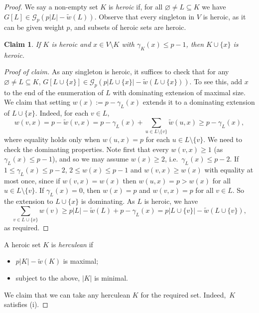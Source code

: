 \documentclass[11pt, a4paper]{article}
\newenvironment{poc}{\begin{proof}[Proof of claim]\renewcommand*{\qedsymbol}{$\blacksquare$}}{\end{proof}}
\newtheorem{claim}[theorem]{Claim}
\theoremstyle{definition}
\newcommand{\cG}{\mathcal{G}}
\begin{document}
\begin{proof}
We say a non-empty set $K$ is \emph{heroic} if, for all $\varnothing \neq L \subseteq K$ we have $G[L] \in \mathcal{G}_p(p|L|-\tilde{w}(L))$. Observe that every singleton in $V$ is heroic, as it can be given weight $p$, and subsets of heroic sets are heroic.

\begin{claim}\label{cl-hero}
If $K$ is heroic and $x \in V\setminus K$ with $\gamma_K(x) \leq p-1$, then $K \cup \{x\}$ is heroic.
\end{claim}
\begin{poc}
	As any singleton is heroic, it suffices to check that for any $\varnothing\neq L\subseteq K$, $G[L\cup \{x\}]\in\cG_p(p|L \cup \lbrace x\rbrace| - \tilde{w}(L \cup \lbrace x\rbrace))$. To see this, add $x$ to the end of the enumeration of $L$ with dominating extension of maximal size. We claim that setting $w(x):=p-\gamma_L(x)$ extends it to a dominating extension of $L\cup \{x\}$. Indeed, for each $v\in L$, \begin{equation*}%
		w(v,x)=p- \tilde{w}(v,x)= p-\gamma_L(x)+\sum_{u\in L\setminus \{v\}}\tilde{w}(u,x)\geq p-\gamma_L(x),
	\end{equation*}
	where equality holds only when $w(u,x)=p$ for each $u\in L\setminus \{v\}$.
	We need to check the dominating properties.
	Note first that every $w(v,x) \geq 1$ (as $\gamma_L(x) \leq p-1$), and so we may assume $w(x)\ge 2$, i.e.~$\gamma_L(x)\le p-2$. 
	If $1 \leq \gamma_L(x) \leq p-2$, $2 \leq w(x) \leq p-1$ and $w(v,x) \geq w(x)$ with equality at most once, since if $w(v,x)=w(x)$ then $w(u,x)=p>w(x)$ for all $u \in L\setminus\{v\}$.
	If $\gamma_L(x)=0$, then $w(x)=p$ and $w(v,x)=p$ for all $v \in L$.
	So the extension to $L \cup \{x\}$ is dominating.
	As $L$ is heroic, we have
	$$
	\sum_{v \in L\cup\lbrace x\rbrace}w(v) \geq p|L|-\tilde{w}(L)+p-\gamma_L(x) = p|L \cup \lbrace v\rbrace| - \tilde{w}(L \cup \lbrace v\rbrace),
	$$
	as required.
\end{poc}

A heroic set $K$ is \emph{herculean} if
\begin{itemize}
	\item $p|K|-\tilde{w}(K)$ is maximal; 
	\item subject to the above, $|K|$ is minimal.
\end{itemize}
We claim that we can take any herculean $K$ for the required set.
Indeed,~$K$ satisfies (i).
	

\end{proof}
\end{document}
